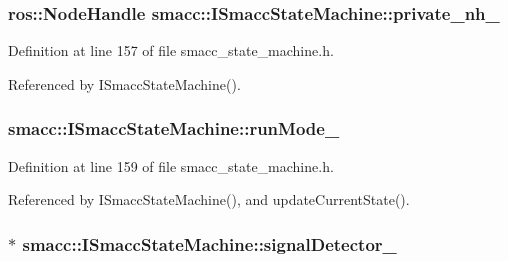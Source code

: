 \subsubsection[{\texorpdfstring{private\+\_\+nh\+\_\+}{private_nh_}}]{\setlength{\rightskip}{0pt plus 5cm}ros\+::\+Node\+Handle smacc\+::\+I\+Smacc\+State\+Machine\+::private\+\_\+nh\+\_\+\hspace{0.3cm}{\ttfamily [private]}}\hypertarget{classsmacc_1_1ISmaccStateMachine_a9c6a5c647ecca6599589c12fdcd53bfc}{}\label{classsmacc_1_1ISmaccStateMachine_a9c6a5c647ecca6599589c12fdcd53bfc}


Definition at line 157 of file smacc\+\_\+state\+\_\+machine.\+h.



Referenced by I\+Smacc\+State\+Machine().

\subsubsection[{\texorpdfstring{run\+Mode\+\_\+}{runMode_}}]{ smacc\+::\+I\+Smacc\+State\+Machine\+::run\+Mode\+\_\+\hspace{0.3cm}{\ttfamily [private]}}\hypertarget{classsmacc_1_1ISmaccStateMachine_a9f8cfbf577f7ae7a48b7a328e2e6b589}{}\label{classsmacc_1_1ISmaccStateMachine_a9f8cfbf577f7ae7a48b7a328e2e6b589}


Definition at line 159 of file smacc\+\_\+state\+\_\+machine.\+h.



Referenced by I\+Smacc\+State\+Machine(), and update\+Current\+State().

\subsubsection[{\texorpdfstring{signal\+Detector\+\_\+}{signalDetector_}}]{$\ast$ smacc\+::\+I\+Smacc\+State\+Machine\+::signal\+Detector\+\_\+\hspace{0.3cm}{\ttfamily [private]}}\hypertarget{classsmacc_1_1ISmaccStateMachine_a3982eb671f5f001cb047d3a467789986}{}\label{classsmacc_1_1ISmaccStateMachine_a3982eb671f5f001cb047d3a467789986}


